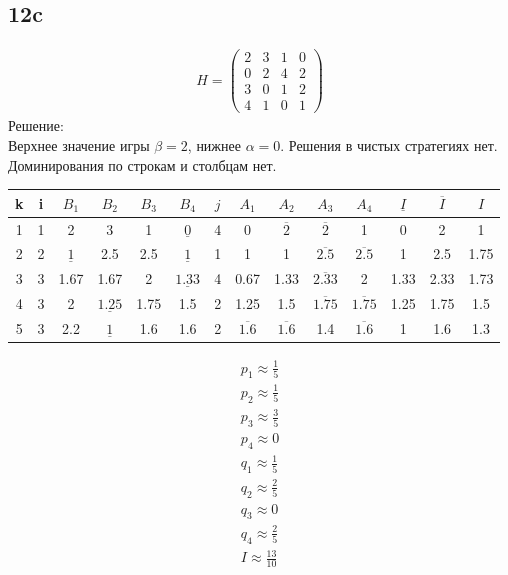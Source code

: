 \documentclass{article}
\begin{document}
\subsection*{12c}
\begin{gather*}H = \left(\begin{matrix}
2 & 3 & 1 & 0\\
0 & 2 & 4 & 2\\
3 & 0 & 1 & 2\\
4 & 1 & 0 & 1
\end{matrix}\right)\end{gather*}
Решение:\\
Верхнее значение игры $\beta=2$, нижнее $\alpha=0$. Решения в чистых стратегиях нет. Доминирования по строкам и столбцам нет.\\
\begin{tabular}{||c||c||c|c|c|c||c||c|c|c|c||c||c||c||}
\hline
k & i & $B_1$ & $B_2$ & $B_3$ & $B_4$ & $j$ & $A_1$ & $A_2$ & $A_3$ & $A_4$ &$\underline{I}$ & $\overline{I}$ & $I$\\
\hline
1 & 1 & 2 & 3 & 1 & $\underline{0}$ & 4 & 0 & $\overline{2}$ & $\overline{2}$ & 1 & 0 & 2 & 1\\
\hline
2 & 2 & $\underline{1}$ & 2.5 & 2.5 & $\underline{1}$ & 1 & 1 & 1 & $\overline{2.5}$ & $\overline{2.5}$ & 1 & 2.5 & 1.75\\
\hline
3 & 3 & 1.67 & 1.67 & 2 & $\underline{1.33}$ & 4 & 0.67 & 1.33 & $\overline{2.33}$ & 2 & 1.33 & 2.33 & 1.73\\
\hline
4 & 3 & 2 & $\underline{1.25}$ & 1.75 & 1.5 & 2 & 1.25 & 1.5 & $\overline{1.75}$ & $\overline{1.75}$ & 1.25 & 1.75 & 1.5\\
\hline
5 & 3 & 2.2 & $\underline{1}$ & 1.6 & 1.6 & 2 & $\overline{1.6}$ & $\overline{1.6}$ & 1.4 & $\overline{1.6}$ & 1 & 1.6 & 1.3\\
\hline
\end{tabular}
\begin{gather*}
p_1 \approx \frac{1}{5}\\
p_2 \approx \frac{1}{5}\\
p_3 \approx \frac{3}{5}\\
p_4 \approx 0\\
q_1 \approx \frac{1}{5}\\
q_2 \approx \frac{2}{5}\\
q_3 \approx 0\\
q_4 \approx \frac{2}{5}\\
I \approx \frac{13}{10}
\end{gather*}
\end{document}
